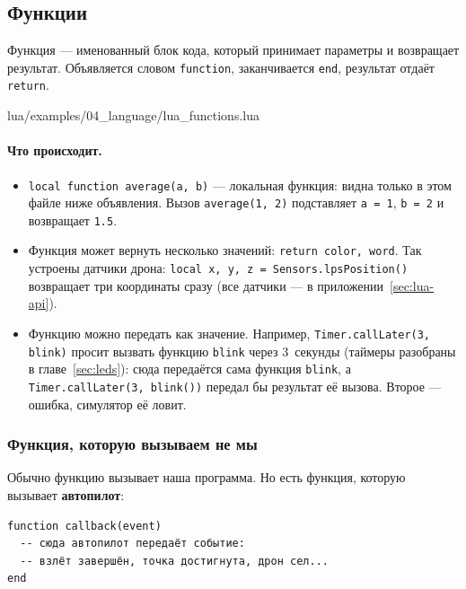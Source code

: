 \subsection{Функции}

Функция --- именованный блок кода, который принимает параметры и возвращает результат. Объявляется словом \verb|function|, заканчивается \verb|end|, результат отдаёт \verb|return|.

\begin{codefile}{lua/examples/04_language/lua_functions.lua}
\end{codefile}

\paragraph{Что происходит.}
\begin{itemize}
    \item \verb|local function average(a, b)| --- локальная функция: видна только в этом файле ниже объявления. Вызов \verb|average(1, 2)| подставляет \verb|a = 1|, \verb|b = 2| и возвращает \verb|1.5|.
    \item Функция может вернуть несколько значений: \verb|return color, word|. Так устроены датчики дрона: \verb|local x, y, z = Sensors.lpsPosition()| возвращает три координаты сразу (все датчики --- в приложении~\ref{sec:lua-api}).
    \item Функцию можно передать как значение. Например, \verb|Timer.callLater(3, blink)| просит вызвать функцию \verb|blink| через 3~секунды (таймеры разобраны в главе~\ref{sec:leds}): сюда передаётся сама функция \verb|blink|, а \verb|Timer.callLater(3, blink())| передал бы результат её вызова. Второе --- ошибка, симулятор её ловит.
\end{itemize}

\subsubsection*{Функция, которую вызываем не мы}

Обычно функцию вызывает наша программа. Но есть функция, которую вызывает \textbf{автопилот}:

\begin{codebox}
\begin{verbatim}
function callback(event)
  -- сюда автопилот передаёт событие:
  -- взлёт завершён, точка достигнута, дрон сел...
end
\end{verbatim}
\end{codebox}

